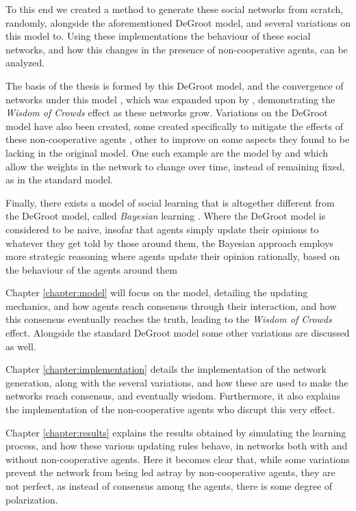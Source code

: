 \documentclass[a4paper, 12pt]{report}
\begin{document}
\noindent To this end we created a method to generate these social networks from scratch, randomly, alongside the aforementioned DeGroot model, and several variations on this model to. Using these implementations the behaviour of these social networks, and how this changes in the presence of non-cooperative agents, can be analyzed.

\noindent The basis of the thesis is formed by this DeGroot model, and the convergence of networks under this model \parencite{degroot1974concensus}, which was expanded upon by \cite{jackson2010social}, demonstrating the \emph{Wisdom of Crowds} effect as these networks grow. Variations on the DeGroot model have also been created, some created specifically to mitigate the effects of these non-cooperative agents \parencite{amir2021robust}, other to improve on some aspects they found to be lacking in the original model. One such example are the model by \cite{chatterjee1977stochastic} and \cite{demarzo2003changing} which allow the weights in the network to change over time, instead of remaining fixed, as in the standard model.

\noindent Finally, there exists a model of social learning that is altogether different from the DeGroot model, called \emph{Bayesian} learning \parencite{GALE2003329}. Where the DeGroot model is considered to be naive, insofar that agents simply update their opinions to whatever they get told by those around them, the Bayesian approach employs more strategic reasoning where agents update their opinion rationally, based on the behaviour of the agents around them 

\noindent Chapter \ref{chapter:model} will focus on the model, detailing the updating mechanics, and how agents reach consensus through their interaction, and how this consensus eventually reaches the truth, leading to the \emph{Wisdom of Crowds} effect. Alongside the standard DeGroot model some other variations are discussed as well.

\noindent Chapter \ref{chapter:implementation} details the implementation of the network generation, along with the several variations, and how these are used to make the networks reach consensus, and eventually wisdom. Furthermore, it also explains the implementation of the non-cooperative agents who disrupt this very effect.

\noindent Chapter \ref{chapter:results} explains the results obtained by simulating the learning process, and how these various updating rules behave, in networks both with and without non-cooperative agents. Here it becomes clear that, while some variations prevent the network from being led astray by non-cooperative agents, they are not perfect, as instead of consensus among the agents, there is some degree of polarization.
\end{document}

